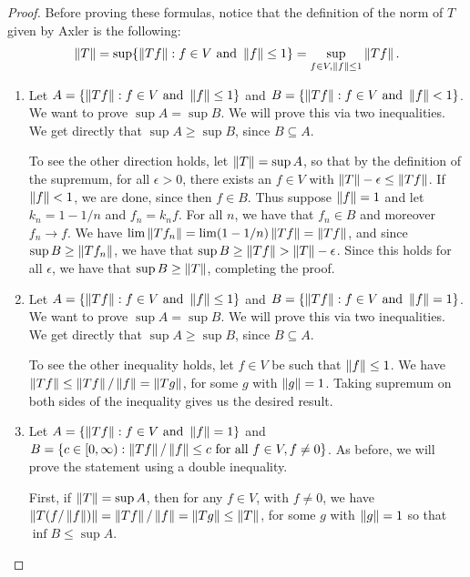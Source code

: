 \begin{proof}
Before proving these formulas, notice that the definition of the norm of $T$ given by Axler is the following: 
\begin{align*}
    \left\lVert T\right\rVert 
    = \sup \{\left\lVert Tf\right\rVert: f \in V \text{ and } \left\lVert f\right\rVert \leq 1\}
    = \sup_{f \in V, \left\lVert f\right\rVert \leq 1} \left\lVert Tf\right\rVert.
\end{align*}

\begin{enumerate}
    \item Let $A = \{\left\lVert Tf\right\rVert: f \in V \text{ and } \left\lVert f\right\rVert \leq 1\}$ and $B = \{\left\lVert Tf\right\rVert: f \in V \text{ and } \left\lVert f\right\rVert < 1\}$.
    We want to prove $\sup A = \sup B$.
    We will prove this via two inequalities.
    We get directly that $\sup A \geq \sup B$, since $B \subseteq A$.
    
    To see the other direction holds, let $\left\lVert T\right\rVert = \sup A$, so that by the definition of the supremum, for all $\epsilon > 0$, there exists an $f \in V$ with $\left\lVert T\right\rVert - \epsilon \leq \left\lVert Tf\right\rVert$.
    If $\left\lVert f\right\rVert < 1$, we are done, since then $f \in B$.
    Thus suppose $\left\lVert f\right\rVert = 1$ and let $k_n = 1- 1/n$ and $f_n = k_n f$.
    For all $n$, we have that $f_n \in B$ and moreover $f_n \to f$.
    We have $\lim \left\lVert Tf_n\right\rVert = \lim (1 - 1/n)\left\lVert Tf\right\rVert = \left\lVert Tf\right\rVert$, and since $\sup B \geq \left\lVert Tf_n\right\rVert$, we have that $\sup B \geq \left\lVert Tf\right\rVert > \left\lVert T\right\rVert - \epsilon$.
    Since this holds for all $\epsilon$, we have that $\sup B \geq \left\lVert T\right\rVert$, completing the proof.
    
    \item Let $A = \{\left\lVert Tf\right\rVert: f \in V \text{ and } \left\lVert f\right\rVert \leq 1\}$ and $B = \{\left\lVert Tf\right\rVert: f \in V \text{ and } \left\lVert f\right\rVert = 1\}$.
    We want to prove $\sup A = \sup B$.
    We will prove this via two inequalities.
    We get directly that $\sup A \geq \sup B$, since $B \subseteq A$.
    
    To see the other inequality holds, let $f \in V$ be such that $\left\lVert f\right\rVert \leq 1$.
    We have $\left\lVert Tf\right\rVert \leq \left\lVert Tf\right\rVert/\left\lVert f\right\rVert = \left\lVert Tg\right\rVert$, for some $g$ with $\left\lVert g\right\rVert = 1$.
    Taking supremum on both sides of the inequality gives us the desired result.
    
    \item Let $A = \{\left\lVert Tf\right\rVert: f \in V \text{ and } \left\lVert f\right\rVert = 1\}$ and $B = \{c \in [0, \infty): \left\lVert Tf\right\rVert/\left\lVert f\right\rVert \leq c \text{ for all } f \in V, f \neq 0\}$.
    As before, we will prove the statement using a double inequality.

    First, if $\left\lVert T\right\rVert = \sup A$, then for any $f \in V$, with $f \neq 0$, we have $\left\lVert T(f/\left\lVert f\right\rVert)\right\rVert = \left\lVert Tf\right\rVert/\left\lVert f\right\rVert = \left\lVert Tg\right\rVert \leq \left\lVert T\right\rVert$, for some $g$ with $\left\lVert g\right\rVert = 1$ so that $\inf B \leq \sup A$.


\end{enumerate}
\end{proof}
